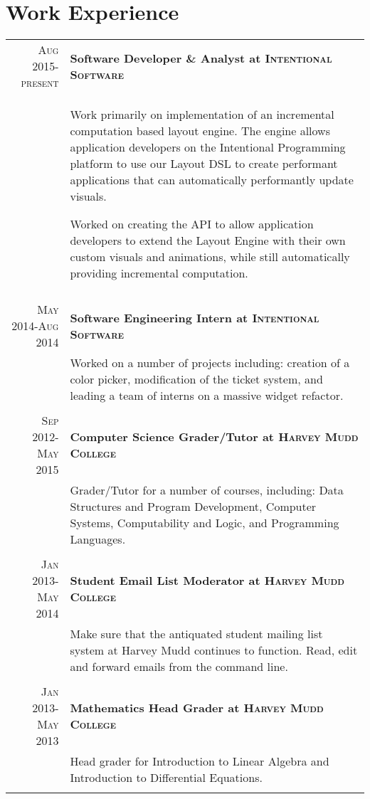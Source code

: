 \documentclass[letterpaper,10pt]{article} %
\newcommand{\work}[3]{ \textsc{#1} & \textbf{#2} \\
& #3\\
\multicolumn{2}{c}{} \\}
\begin{document}
\section{Work Experience}

\begin{tabular}{r|p{14.5cm}} %



\work{Aug 2015-present}{Software Developer \& Analyst at \textsc{Intentional Software}}{
  Work primarily on implementation of an incremental computation based layout engine. The engine allows application developers on the Intentional Programming
  platform to use our Layout DSL to create performant applications that can automatically performantly update visuals. 

  Worked on creating
  the API to allow application developers to extend the Layout Engine with their own custom visuals and animations, while still automatically providing incremental
  computation.
}


\work{May 2014-Aug 2014}{Software Engineering Intern at \textsc{Intentional Software}}{
	Worked on a number of projects including: creation of a color picker, modification of the ticket system, and
	leading a team of interns on a massive widget refactor.
}


\work{Sep 2012-May 2015}{Computer Science Grader/Tutor at \textsc{Harvey Mudd College}}{
	Grader/Tutor for a number of courses, including: Data Structures and Program Development, Computer Systems, Computability and Logic, and Programming Languages.
}


\work{Jan 2013-May 2014}{Student Email List Moderator at \textsc{Harvey Mudd College}}{
	Make sure that the antiquated student mailing list system at Harvey Mudd continues to function. Read, edit and forward emails from the command line.
}


\work{Jan 2013-May 2013}{Mathematics Head Grader at \textsc{Harvey Mudd College}}{
	Head grader for Introduction to Linear Algebra and Introduction to Differential Equations.
}

\end{tabular}
\vspace{-3mm} %
\end{document}
